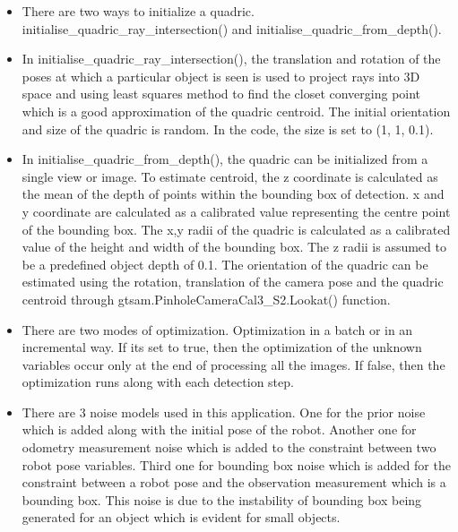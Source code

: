\documentclass[report.tex]{subfiles}
\begin{document}
\begin{itemize}
\item There are two ways to initialize a quadric. initialise\_quadric\_ray\_intersection() and \newline initialise\_quadric\_from\_depth().
\item In initialise\_quadric\_ray\_intersection(), the translation and rotation of the poses at which a particular object is seen is used to project rays into 3D space and using least squares method to find the closet converging point which is a good approximation of the quadric centroid. The initial orientation and size of the quadric is random. In the code, the size is set to (1, 1, 0.1).
\item In initialise\_quadric\_from\_depth(), the quadric can be initialized from a single view or image. To estimate centroid, the z coordinate is calculated as the mean of the depth of points within the bounding box of detection. x and y coordinate are calculated as a calibrated value representing the centre point of the bounding box. The x,y radii of the quadric is calculated as a calibrated value of the height and width of the bounding box. The z radii is assumed to be a predefined object depth of 0.1. The orientation of the quadric can be estimated using the rotation, translation of the camera pose and the quadric centroid through gtsam.PinholeCameraCal3\_S2.Lookat() function.
\item There are two modes of optimization. Optimization in a batch or in an incremental way. If its set to true, then the optimization of the unknown variables occur only at the end of processing all the images. If false, then the optimization runs along with each detection step.
\item There are 3 noise models used in this application. One for the prior noise which is added along with the initial pose of the robot. Another one for odometry measurement noise which is added to the constraint between two robot pose variables. Third one for bounding box noise which is added for the constraint between a robot pose and the observation measurement which is a bounding box. This noise is due to the instability of bounding box being generated for an object which is evident for small objects.



\end{itemize}
\end{document}
